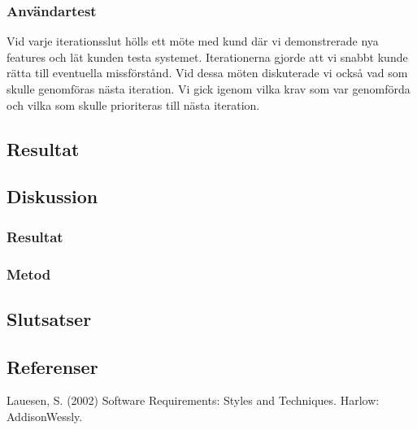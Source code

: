 \subsubsection{Användartest}
Vid varje iterationsslut hölls ett möte med kund där vi demonstrerade nya features och lät kunden testa systemet. Iterationerna gjorde att vi snabbt kunde rätta till eventuella missförstånd. Vid dessa möten diskuterade vi också vad som skulle genomföras nästa iteration. Vi gick igenom vilka krav som var genomförda och vilka som skulle prioriteras till nästa iteration.

\subsection{Resultat}
\subsection{Diskussion}
\subsubsection{Resultat}
\subsubsection{Metod}
\subsection{Slutsatser}
\subsection{Referenser}
\begin{thebibliography}{9}
Lauesen, S. (2002) Software Requirements: Styles and Techniques. Harlow: AddisonWessly.
\end{thebibliography}


